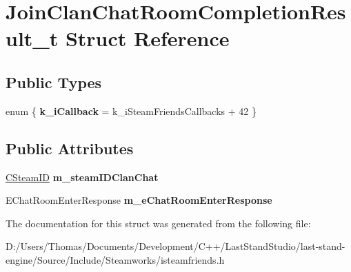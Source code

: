 \hypertarget{structJoinClanChatRoomCompletionResult__t}{}\section{Join\+Clan\+Chat\+Room\+Completion\+Result\+\_\+t Struct Reference}
\label{structJoinClanChatRoomCompletionResult__t}
\subsection*{Public Types}
\begin{DoxyCompactItemize}
\item 
\hypertarget{structJoinClanChatRoomCompletionResult__t_a22c4a1804147eb416feec2c0e3fb1585}{}enum \{ {\bfseries k\+\_\+i\+Callback} = k\+\_\+i\+Steam\+Friends\+Callbacks + 42
 \}\label{structJoinClanChatRoomCompletionResult__t_a22c4a1804147eb416feec2c0e3fb1585}

\end{DoxyCompactItemize}
\subsection*{Public Attributes}
\begin{DoxyCompactItemize}
\item 
\hypertarget{structJoinClanChatRoomCompletionResult__t_acba80a75a04476acdb57ce036e3941a9}{}\hyperlink{classCSteamID}{C\+Steam\+I\+D} {\bfseries m\+\_\+steam\+I\+D\+Clan\+Chat}\label{structJoinClanChatRoomCompletionResult__t_acba80a75a04476acdb57ce036e3941a9}

\item 
\hypertarget{structJoinClanChatRoomCompletionResult__t_adbca976ba4faeefc1a2cd6227dc443d7}{}E\+Chat\+Room\+Enter\+Response {\bfseries m\+\_\+e\+Chat\+Room\+Enter\+Response}\label{structJoinClanChatRoomCompletionResult__t_adbca976ba4faeefc1a2cd6227dc443d7}

\end{DoxyCompactItemize}


The documentation for this struct was generated from the following file\+:\begin{DoxyCompactItemize}
\item 
D\+:/\+Users/\+Thomas/\+Documents/\+Development/\+C++/\+Last\+Stand\+Studio/last-\/stand-\/engine/\+Source/\+Include/\+Steamworks/isteamfriends.\+h\end{DoxyCompactItemize}
